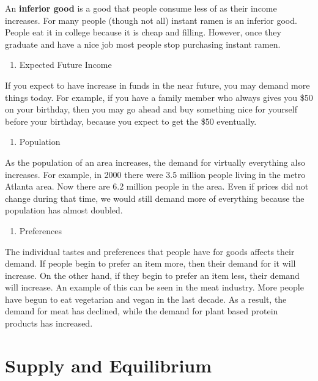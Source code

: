 \documentclass[
]{book}
\providecommand{\tightlist}{%
  \setlength{\itemsep}{0pt}\setlength{\parskip}{0pt}}
\begin{document}
An \textbf{inferior good} is a good that people consume less of as their income increases. For many people (though not all) instant ramen is an inferior good. People eat it in college because it is cheap and filling. However, once they graduate and have a nice job most people stop purchasing instant ramen.

\begin{enumerate}
\def\labelenumi{\arabic{enumi}.}
\setcounter{enumi}{3}
\tightlist
\item
  Expected Future Income
\end{enumerate}

If you expect to have increase in funds in the near future, you may demand more things today. For example, if you have a family member who always gives you \$50 on your birthday, then you may go ahead and buy something nice for yourself before your birthday, because you expect to get the \$50 eventually.

\begin{enumerate}
\def\labelenumi{\arabic{enumi}.}
\setcounter{enumi}{4}
\tightlist
\item
  Population
\end{enumerate}

As the population of an area increases, the demand for virtually everything also increases. For example, in 2000 there were 3.5 million people living in the metro Atlanta area. Now there are 6.2 million people in the area. Even if prices did not change during that time, we would still demand more of everything because the population has almost doubled.

\begin{enumerate}
\def\labelenumi{\arabic{enumi}.}
\setcounter{enumi}{5}
\tightlist
\item
  Preferences
\end{enumerate}

The individual tastes and preferences that people have for goods affects their demand. If people begin to prefer an item more, then their demand for it will increase. On the other hand, if they begin to prefer an item less, their demand will increase. An example of this can be seen in the meat industry. More people have begun to eat vegetarian and vegan in the last decade. As a result, the demand for meat has declined, while the demand for plant based protein products has increased.

\chapter{Supply and Equilibrium}\label{supply-and-equilibrium}
\end{document}
